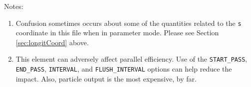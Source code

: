 Notes: 
\begin{enumerate}
\item Confusion sometimes occurs about some of the quantities related
  to the {\tt s} coordinate in this file when in parameter mode.  Please
  see Section \ref{sec:longitCoord} above.
\item This element can adversely affect parallel efficiency. Use of the
  \verb|START_PASS|, \verb|END_PASS|, \verb|INTERVAL|,  and \verb|FLUSH_INTERVAL|
  options can help reduce the impact. Also, particle output is the most expensive, by far.
\end{enumerate}
